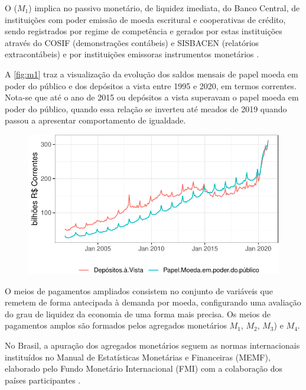 \documentclass[12pt,12pt,openright,oneside,a4paper,chapter=TITLE,section=TITLE,subsection=TITLE,subsubsection=TITLE,english,french,spanish,portugues,sumario=tradicional]{abntex2}
\begin{document}
O (\(M_1\)) implica no passivo monetário, de liquidez imediata, do Banco Central, de instituições com poder emissão de moeda escritural e cooperativas de crédito, sendo registrados por regime de competência e gerados por estas instituições através do COSIF (demonstrações contábeis) e SISBACEN (relatórios extracontábeis) e por instituições emissoras instrumentos monetários \cite{sgs:m1} \cite{sgs:mpa}.

A \autoref{fig:m1} traz a visualização da evolução dos saldos mensais de papel moeda em poder do público e dos depósitos a vista entre 1995 e 2020, em termos correntes. Nota-se que até o ano de 2015 ou depósitos a vista superavam o papel moeda em poder do público, quando essa relação se inverteu até meados de 2019 quando passou a apresentar comportamento de igualdade.

\begin{figure}

\begin{center}\includegraphics{12-exportedfigures/m1-1} \end{center}
\label{fig:m1}
\end{figure}

O meios de pagamentos ampliados consistem no conjunto de variáveis que remetem de forma antecipada à demanda por moeda, configurando uma avaliação do grau de liquidez da economia de uma forma mais precisa. Os meios de pagamentos amplos são formados pelos agregados monetários \(M_1\), \(M_2\), \(M_3\)) e \(M_4\).

No Brasil, a apuração dos agregados monetários seguem as normas internacionais instituídos no Manual de Estatísticas Monetárias e Financeiras (MEMF), elaborado pelo Fundo Monetário Internacional (FMI) com a colaboração dos países participantes \cite{sgs:mpa}.
\end{document}
